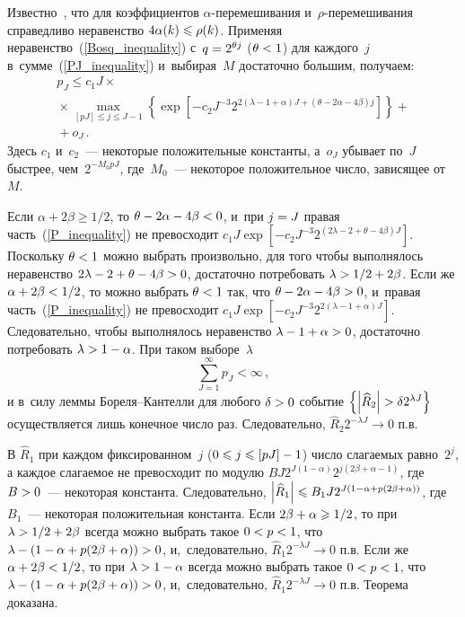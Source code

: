 \begin{multicols}{2}
Известно~\cite{15-sh1}, что для коэффициентов $\alpha$-пе\-ре\-ме\-ши\-ва\-ния 
и~$\rho$-пе\-ре\-ме\-ши\-ва\-ния справедливо неравенство $4\alpha(k)\hm\leqslant\rho(k)$. 
Применяя неравенство~(\ref{Bosq_inequality}) с~$q\hm=2^{\theta j}$ ($\theta\hm<1$) 
для каждого~$j$ в~сумме~(\ref{PJ_inequality}) и~выбирая~$M$
 достаточно большим, получаем:
\begin{multline}
p_J\leqslant c_1 J\times{}\\
{}\times\max\limits_{[pJ]\leqslant j\leqslant J-1}
\left\{\exp\!\left[-c_2J^{-3} 2^{2(\lambda-1+\alpha)J+(\theta-2\alpha-4\beta)j}\right]
\!\right\}+{}\\
{}+o_J\,.
\label{P_inequality}
\end{multline}
Здесь $c_1$ и~$c_2$~--- некоторые положительные константы, а~$o_J$ убывает по~$J$ 
быстрее, чем~$2^{-M_0 pJ}$, где~$M_0$~--- некоторое положительное число, 
зависящее от~$M$.

Если $\alpha+2\beta\geqslant 1/2$, то $\theta\hm-2\alpha\hm-4\beta\hm<0$, и~при $j\hm=J$ 
правая часть~(\ref{P_inequality}) не превосходит $c_1 J\exp\left[-c_2J^{-3} 
2^{(2\lambda-2+\theta-4\beta)J}\right]$. Поскольку $\theta\hm<1$ 
можно выбрать произвольно, для того чтобы выполнялось неравенство 
$2\lambda\hm-2\hm+\theta\hm-4\beta\hm>0$,
 до\-статочно потребовать $\lambda\hm>1/2\hm+2\beta$. 
Если же\linebreak $\alpha\hm+2\beta\hm<1/2$, то можно выбрать $\theta\hm<1$ так, 
что $\theta\hm-2\alpha\hm-4\beta\hm>0$, и~правая часть~(\ref{P_inequality}) 
не превосходит $c_1 J\exp\left[-c_2J^{-3} 2^{2(\lambda-1+\alpha)J}\right]$. 
Следовательно, чтобы выполнялось неравенство $\lambda\hm-1\hm+\alpha\hm>0$, достаточно 
потребовать $\lambda\hm>1\hm-\alpha$. При таком выборе~$\lambda$
\begin{equation*}
\sum\limits_{J=1}^{\infty}p_J<\infty\,,
\end{equation*}
и в~силу леммы Бо\-ре\-ля--Кан\-тел\-ли для любого $\delta\hm>0$ 
событие $\left\{\abs{\widehat{R}_2}\hm>\delta2^{\lambda J}\right\}$ осуществляется лишь 
конечное число раз. Следовательно, $\widehat{R}_2 2^{-\lambda J}\rightarrow 0$ п.в.

В $\widehat{R}_1$ при каждом фиксированном~$j$ ($0\hm\leqslant j\hm\leqslant [pJ]\hm-1$) 
чис\-ло слагаемых равно~$2^j$, а каждое слагаемое не превосходит по
 модулю $B J2^{J(1-\alpha)}2^{j(2\beta+\alpha-1)}$, где $B\hm>0$~--- 
 некоторая константа. Следовательно, 
 $\abs{\widehat{R}_1}\hm\leqslant B_1J 2^{J(1-\alpha+p(2\beta+\alpha))}$, где 
 $B_1$~--- некоторая положительная константа. Если $2\beta\hm+\alpha\hm\geqslant1/2$, 
 то при $\lambda\hm>1/2\hm+2\beta$ всегда можно выбрать такое $0\hm<p\hm<1$, что 
 $\lambda\hm-(1\hm-\alpha\hm+p(2\beta\hm+\alpha))\hm>0$, и,~следовательно, 
 $\widehat{R}_1 2^{-\lambda J}\rightarrow 0$ п.в. 
 Если же $\alpha\hm+2\beta\hm<1/2$, то при $\lambda\hm>1\hm-\alpha$ 
 всегда можно выбрать такое $0\hm<p\hm<1$, что $\lambda\hm-(1\hm-\alpha\hm+p(2\beta
 \hm+\alpha))\hm>0$, и,~следовательно, $\widehat{R}_1 2^{-\lambda J}\rightarrow 0$ 
 п.в. Теорема до\-ка\-зана.



\end{multicols}
